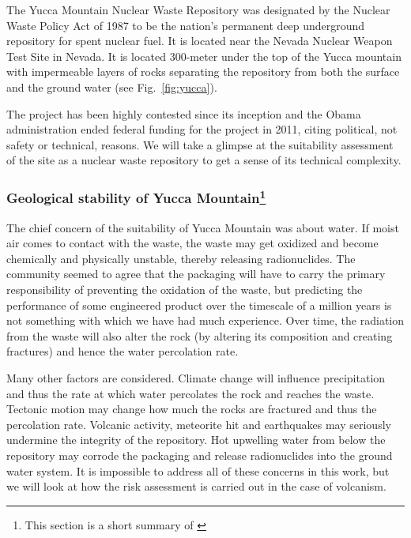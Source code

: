 \documentclass[nofootinbib,preprint,aps]{revtex4-1}
\begin{document}
        The Yucca Mountain Nuclear Waste Repository was designated by the Nuclear Waste Policy Act
        of 1987 to be the nation's permanent deep underground repository for spent nuclear fuel. It is
        located near the Nevada Nuclear Weapon Test Site in Nevada.
        It is located 300-meter under the top of the Yucca mountain with impermeable layers of rocks
        separating the repository
        from both the surface and the ground water (see Fig.~\ref{fig:yucca}).

        The project has been highly contested since its
        inception and the Obama administration ended federal funding for the project in 2011, citing political,
        not safety or technical, reasons. We will take a glimpse at the suitability assessment of the site
        as a nuclear waste repository to get a sense of its technical complexity.

        \subsubsection{Geological stability of Yucca Mountain\footnote{This section is a short summary of \cite{m06}}}
        The chief concern of the suitability of Yucca Mountain was about water. If moist air comes to
        contact with the waste, the waste may get oxidized and become chemically and physically unstable, thereby
        releasing radionuclides.
        The community seemed to agree that the packaging will have to carry the primary
        responsibility of preventing the oxidation of the waste, but predicting the performance of some
        engineered product over the timescale of a million years is not something with which we have had much 
        experience. Over time, the radiation from the waste will also alter the rock (by altering its composition
        and creating fractures) and hence the water percolation rate.

        Many other factors are considered. Climate change will influence precipitation and thus the
        rate at which water percolates the rock and reaches the waste. 
        Tectonic motion may change how much the rocks are fractured and thus the percolation rate.
        Volcanic activity, meteorite hit and earthquakes may seriously undermine the integrity of the repository.
        Hot upwelling water from below the repository may corrode the packaging and release radionuclides into
        the ground water system. It is impossible to address all of these concerns in this work, but we will look
        at how the risk assessment is carried out in the case of volcanism.
\end{document}
